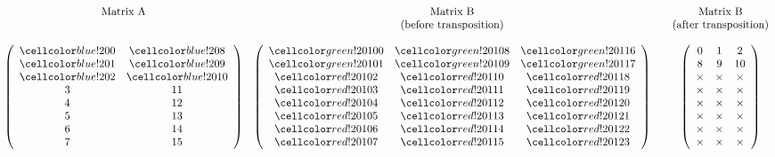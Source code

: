 \begin{minipage}{\linewidth}
\begin{align*}
\begin{matrix}
\textrm{Matrix A} & \textrm{Matrix B}  & & \textrm{Matrix B}\\
&\textrm{(before transposition)}&&\textrm{(after transposition)}\\
\\
\left(\begin{array}{cc}
\colSrc 0 & \colSrc 8\\
\colSrc 1 & \colSrc 9\\
\colSrc 2 & \colSrc 10\\
3 & 11\\
4 & 12\\
5 & 13\\
6 & 14\\
7 & 15
\end{array}\right) 
&
\left(\begin{array}{ccc}
\colTgt 100 & \colTgt 108 & \colTgt 116\\
\colTgt 101 & \colTgt 109 & \colTgt 117\\
\colOwr 102 & \colOwr 110 & \colOwr 118\\
\colOwr 103 & \colOwr 111 & \colOwr 119\\
\colOwr 104 & \colOwr 112 & \colOwr 120\\
\colOwr 105 & \colOwr 113 & \colOwr 121\\
\colOwr 106 & \colOwr 114 & \colOwr 122\\
\colOwr 107 & \colOwr 115 & \colOwr 123
\end{array}\right) 
&&
\left(\begin{array}{ccc}
0 & 1 & 2\\
8 & 9 & 10\\
\times & \times & \times\\
\times & \times & \times\\
\times & \times & \times\\
\times & \times & \times\\
\times & \times & \times\\
\times & \times & \times\\
\end{array}\right) 
\end{matrix}
\end{align*}
\end{minipage}


